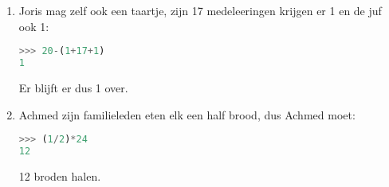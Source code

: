 \begin{enumerate}
\item Joris mag zelf ook een taartje, zijn 17 medeleeringen krijgen er 1 en de juf ook 1:
\begin{lstlisting}[language=Python]
>>> 20-(1+17+1)
1
\end{lstlisting}
Er blijft er dus 1 over.
\item Achmed zijn familieleden eten elk een half brood, dus Achmed moet:
\begin{lstlisting}[language=Python]
>>> (1/2)*24
12
\end{lstlisting}
12 broden halen.
\end{enumerate}
